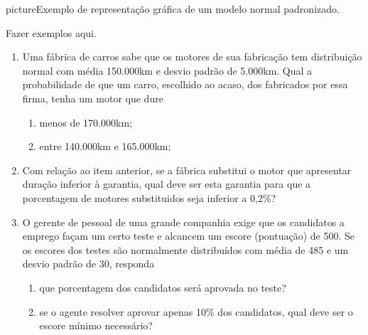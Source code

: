 \begin{sidepicture}{4cm}{picture}{Exemplo de representação gráfica de um modelo normal padronizado.}
	\label{fig:cap0:modelo_normal_padronizada}
\end{sidepicture}

{\color{red}Fazer exemplos aqui.}

\newpage\nosidepicturearea
\begin{exercise}\hfill
	\begin{multicols}{2}
	\begin{enumerate}[label=\textbf{\color{ocre}\arabic*.}, itemsep=20pt]
		\item Uma fábrica de carros sabe que os motores de sua fabricação tem distribuição normal com média 150.000km e desvio padrão de 5.000km. Qual a probabilidade de que um carro, escolhido ao acaso, dos fabricados por essa firma, tenha um motor que dure	
			\begin{enumerate}[label=\textbf{\color{ocre}(\alph*)}]
				\item menos de 170.000km;
				\item entre 140.000km e 165.000km;
			\end{enumerate}
			
		\item Com relação ao item anterior, se a fábrica substitui o motor que apresentar duração inferior à garantia, qual deve ser esta garantia para que a porcentagem de motores substituidos seja inferior a 0,2\%?
		
		\item O gerente de pessoal de uma grande companhia exige que os candidatos a emprego façam um certo teste e alcancem um escore (pontuação) de 500. Se os escores dos testes são normalmente distribuídos com média de 485 e um desvio padrão de 30, responda
			\begin{enumerate}[label=\textbf{\color{ocre}(\alph*)}]
				\item que porcentagem dos candidatos será aprovada no teste?
				\item se o agente resolver aprovar apenas 10\% dos candidatos, qual deve ser o escore mínimo necessário?
			\end{enumerate}
			

\end{enumerate}
\end{multicols}
\end{exercise}
